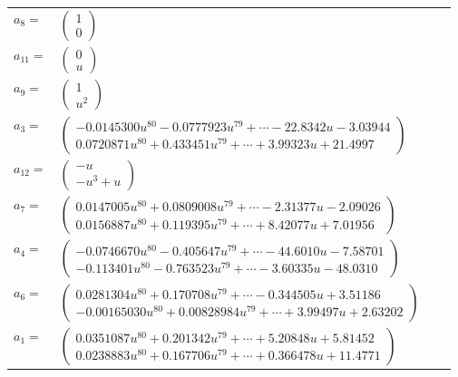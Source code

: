 \documentclass[1p]{elsarticle_modified}
\theoremstyle{definition}
\begin{document}
\begin{tabular}{m{7pt} m{180pt} m{7pt} m{180pt} }
\flushright $a_{8}=$&$\begin{pmatrix}1\\0\end{pmatrix}$ \\
\flushright $a_{11}=$&$\begin{pmatrix}0\\u\end{pmatrix}$ \\
\flushright $a_{9}=$&$\begin{pmatrix}1\\u^2\end{pmatrix}$ \\
\flushright $a_{3}=$&$\begin{pmatrix}-0.0145300 u^{80}-0.0777923 u^{79}+\cdots-22.8342 u-3.03944\\0.0720871 u^{80}+0.433451 u^{79}+\cdots+3.99323 u+21.4997\end{pmatrix}$ \\
\flushright $a_{12}=$&$\begin{pmatrix}- u\\- u^3+u\end{pmatrix}$ \\
\flushright $a_{7}=$&$\begin{pmatrix}0.0147005 u^{80}+0.0809008 u^{79}+\cdots-2.31377 u-2.09026\\0.0156887 u^{80}+0.119395 u^{79}+\cdots+8.42077 u+7.01956\end{pmatrix}$ \\
\flushright $a_{4}=$&$\begin{pmatrix}-0.0746670 u^{80}-0.405647 u^{79}+\cdots-44.6010 u-7.58701\\-0.113401 u^{80}-0.763523 u^{79}+\cdots-3.60335 u-48.0310\end{pmatrix}$ \\
\flushright $a_{6}=$&$\begin{pmatrix}0.0281304 u^{80}+0.170708 u^{79}+\cdots-0.344505 u+3.51186\\-0.00165030 u^{80}+0.00828984 u^{79}+\cdots+3.99497 u+2.63202\end{pmatrix}$ \\
\flushright $a_{1}=$&$\begin{pmatrix}0.0351087 u^{80}+0.201342 u^{79}+\cdots+5.20848 u+5.81452\\0.0238883 u^{80}+0.167706 u^{79}+\cdots+0.366478 u+11.4771\end{pmatrix}$ \\

\end{tabular}
\end{document}
